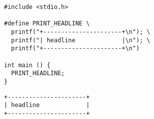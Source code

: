
\begin{frame}[fragile]
%
\begin{codebox}
\begin{verbatim}
#include <stdio.h>

#define PRINT_HEADLINE \
  printf("+----------------------+\n"); \
  printf("| headline             |\n"); \
  printf("+----------------------+\n")

int main () {
  PRINT_HEADLINE;
}
\end{verbatim}
\end{codebox}
%
\begin{cmdbox}[Ausgabe]
\begin{verbatim}
+----------------------+
| headline             |
+----------------------+
\end{verbatim}
\end{cmdbox}
%
\end{frame}


